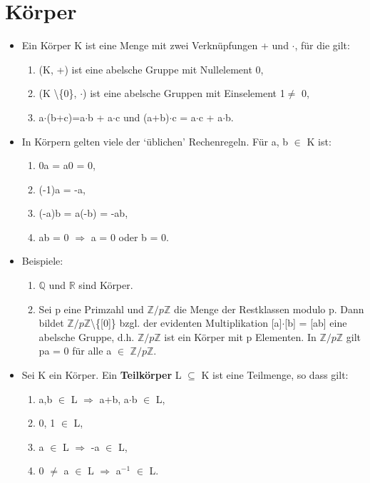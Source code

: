\section{Körper}
\begin{itemize}
\item Ein Körper K ist eine Menge mit zwei Verknüpfungen + und $\cdot$, für die gilt:
\begin{enumerate}
\item (K, +) ist eine abelsche Gruppe mit Nullelement 0,
\item (K \textbackslash \{0\}, $\cdot$) ist eine abelsche Gruppen mit Einselement 1$\neq$ 0,
\item a$\cdot$(b+c)=a$\cdot$b + a$\cdot$c und (a+b)$\cdot$c = a$\cdot$c + a$\cdot$b.
\end{enumerate}
\item In Körpern gelten viele der ‘üblichen’ Rechenregeln. Für a, b $\in$ K ist:
\begin{enumerate} 
\item 0a = a0 = 0, 
\item (-1)a = -a, 
\item (-a)b = a(-b) = -ab, 
\item ab = 0 $\Rightarrow$ a = 0 oder b = 0.
\end{enumerate}
\item Beispiele:
\begin{enumerate}
\item $\mathbb{Q}$ und $\mathbb{R}$ sind Körper.
\item Sei p eine Primzahl und $\mathbb{Z}/p\mathbb{Z}$ die Menge der Restklassen modulo p. Dann bildet $\mathbb{Z}/p\mathbb{Z}$\textbackslash\{[0]\} bzgl. der evidenten Multiplikation [a]$\cdot$[b] = [ab] eine abelsche Gruppe, d.h. $\mathbb{Z}/p\mathbb{Z}$ ist ein Körper mit p Elementen. In $\mathbb{Z}/p\mathbb{Z}$ gilt pa = 0 für alle a $\in$ $\mathbb{Z}/p\mathbb{Z}$.\\
\end{enumerate}
\item Sei K ein Körper. Ein \textbf{Teilkörper} L $\subseteq$ K ist eine Teilmenge, so dass gilt:
\begin{enumerate}
\item a,b $\in$ L $\Rightarrow$ a+b, a$\cdot$b $\in$ L,
\item 0, 1 $\in$ L,
\item a $\in$ L $\Rightarrow$ -a $\in$ L,
\item 0 $\neq$ a $\in$ L $\Rightarrow$ a$^{-1}$ $\in$ L.
\end{enumerate}
\end{itemize}

